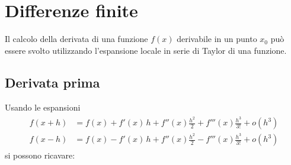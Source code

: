 \documentclass[letterpaper,10pt,italian]{jupyterBook}
\begin{document}
\section{Differenze finite}
\label{\detokenize{ch/numerics/derivatives:differenze-finite}}
\sphinxAtStartPar
Il calcolo della derivata di una funzione \(f(x)\) derivabile in un punto \(x_0\) può essere svolto utilizzando l’espansione locale in serie di Taylor di una funzione.


\subsection{Derivata prima}
\label{\detokenize{ch/numerics/derivatives:derivata-prima}}
\sphinxAtStartPar
Usando le espansioni
\begin{equation*}
\begin{split}\begin{aligned}
  f(x + h) & = f(x) + f'(x) \, h + f''(x) \frac{h^2}{2} + f'''(x) \frac{h^3}{3!} + o(h^3) \\
  f(x - h) & = f(x) - f'(x) \, h + f''(x) \frac{h^2}{2} - f'''(x) \frac{h^3}{3!} + o(h^3)
\end{aligned}\end{split}
\end{equation*}
\sphinxAtStartPar
si possono ricavare:
\end{document}
